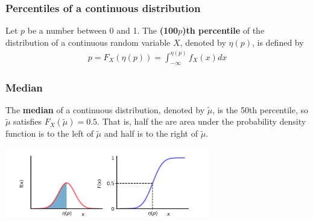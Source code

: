 \documentclass[9pt]{beamer}
\begin{document}
\begin{frame}
\frametitle{Percentiles of a continuous distribution}

\begin{definition}
Let $p$ be a number between 0 and 1. The \textbf{(100$p$)th percentile} of the distribution
of a continuous random variable $X$, denoted by $\eta(p)$, is defined by
\begin{align*}
p = F_X(\eta(p)) = \int_{-\infty}^{\eta(p)}f_X(x) dx
\end{align*}
\end{definition}


\end{frame}

\begin{frame}
\frametitle{Median}

\begin{definition}
The \textbf{median} of a continuous distribution, denoted by $\tilde{\mu}$, is the 50th percentile, so $\tilde{\mu}$ satisfies $F_X( \tilde{\mu}) = 0.5$. That is, half the are area under the probability density function is to the left of $\tilde{\mu}$ and half is to the right of $\tilde{\mu}$.
\end{definition}

\center \includegraphics[height=3cm]{images/median.png}

\end{frame}
\end{document}
